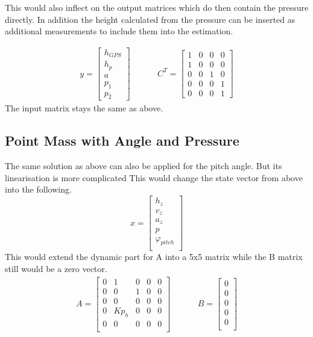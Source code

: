   This would also inflect on the output matrices which do then contain the pressure directly.
  In addition the height calculated from the pressure can be inserted as additional measurements to include them into the estimation.
  
  \begin{align*}
   y = \begin{bmatrix}
        h_{GPS}	\\
        h_{p}	\\
        a	\\
        p_1	\\
        p_2	
       \end{bmatrix}
       & \hspace{1cm}
  C^T = \begin{bmatrix}
       1 & 0 & 0 & 0 \\
       1 & 0 & 0 & 0 \\
       0 & 0 & 1 & 0 \\
       0 & 0 & 0 & 1 \\
       0 & 0 & 0 & 1 
      \end{bmatrix}
  \end{align*}
  The input matrix stays the same as above.

  \subsection{Point Mass with Angle and Pressure}
  The same solution as above can also be applied for the pitch angle. 
  But its linearisation is more complicated 
  This would change the state vector from above into the following.
  $$ x = \begin{bmatrix}
  h_z\\
  v_z\\
  a_z\\
  p\\
  \varphi_{pitch}\\
  \end{bmatrix} $$
  This would extend the dynamic part for A into a 5x5 matrix while the B matrix still would be a zero vector.
  \begin{align*}
  A= \begin{bmatrix}
        0 & 1 & 0 & 0 & 0 \\
        0 & 0 & 1 & 0 & 0 \\
        0 & 0 & 0 & 0 & 0 \\
        0 & Kp_h & 0 & 0 & 0 \\
        0 & 0 & 0 & 0 & 0 \\
        \end{bmatrix}
  & \hspace{1cm}
  B = \begin{bmatrix}
             0 \\
             0 \\
             0 \\
             0 \\
             0 \\
        \end{bmatrix}
  \end{align*}
  
